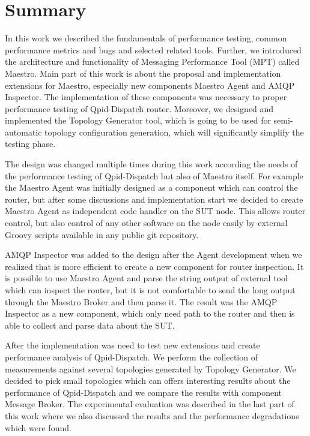 
\chapter{Summary}
\label{Summary}
In this work we described the fundamentals of performance testing, common performance metrics and bugs and selected related tools. Further, we introduced the architecture and functionality of Messaging Performance Tool (MPT) called Maestro. Main part of this work is about the proposal and implementation extensions for Maestro, especially new components Maestro Agent and AMQP Inspector. The implementation of these components was necessary to proper performance testing of Qpid-Dispatch router. Moreover, we designed and implemented the Topology Generator tool, which is going to be used for semi-automatic topology configuration generation, which will significantly simplify the testing phase.

The design was changed multiple times during this work according the needs of the performance testing of Qpid-Dispatch but also of Maestro itself. For example the Maestro Agent was initially designed as a component which can control the router, but after some discussions and implementation start we decided to create Maestro Agent as independent code handler on the SUT node. This allows router control, but also control of any other software on the node easily by external Groovy scripts available in any public git repository.

AMQP Inspector was added to the design after the Agent development when we realized that is more efficient to create a new component for router inspection. It is possible to use Maestro Agent and parse the string output of external tool which can inspect the router, but it is not comfortable to send the long output through the Maestro Broker and then parse it. The result was the AMQP Inspector as a new component, which only need path to the router and then is able to collect and parse data about the SUT.

After the implementation was need to test new extensions and create performance analysis of Qpid-Dispatch. We perform the collection of measurements against several topologies generated by Topology Generator. We decided to pick small topologies which can offers interesting results about the performance of Qpid-Dispatch and we compare the results with component Message Broker. The experimental evaluation was described in the last part of this work where we also discussed the results and the performance degradations which were found.

